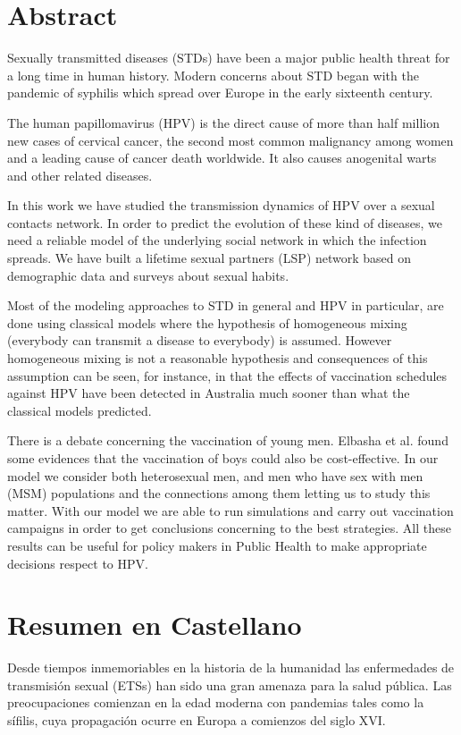 
\chapter*{Abstract}
Sexually transmitted diseases (STDs) have been a major public health threat for a long time in human history. Modern concerns about STD began with the pandemic of syphilis which spread over Europe in the early sixteenth century. 

The human papillomavirus (HPV) is the direct cause of more than half million new cases of cervical cancer, the second most common malignancy among women and a leading cause of cancer death worldwide. It also causes anogenital warts and other related diseases.

In this work we have studied the transmission dynamics of HPV over a sexual contacts network. In order to predict the evolution of these kind of diseases, we need a reliable model of the underlying social network in which the infection spreads. We have built a lifetime sexual partners (LSP) network based on demographic data and surveys about sexual habits.

Most of the modeling approaches to STD in general and HPV in particular, are done using classical models where the hypothesis of homogeneous mixing (everybody can transmit a disease to everybody) is assumed. However homogeneous mixing is not a reasonable hypothesis and consequences of this assumption can be seen, for instance, in that the effects of vaccination schedules against HPV have been detected in Australia much sooner than what the classical models predicted. %

There is a debate concerning the vaccination of young men. Elbasha et al. found some evidences that the vaccination of boys could also be cost-effective. In our model we consider both heterosexual men, and men who have sex with men (MSM) populations and the connections among them letting us to study this matter. With our model we are able to run simulations and carry out vaccination campaigns in order to get conclusions concerning to the best strategies. All these results can be useful for policy makers in Public Health to make appropriate decisions respect to HPV.

\chapter*{Resumen en Castellano}
Desde tiempos inmemoriables en la historia de la humanidad las enfermedades de transmisi\'on sexual (ETSs) han sido una gran amenaza para la salud p\'ublica. Las preocupaciones comienzan en la edad moderna con pandemias tales como la s\'ifilis, cuya propagaci\'on ocurre en Europa a comienzos del siglo XVI.

